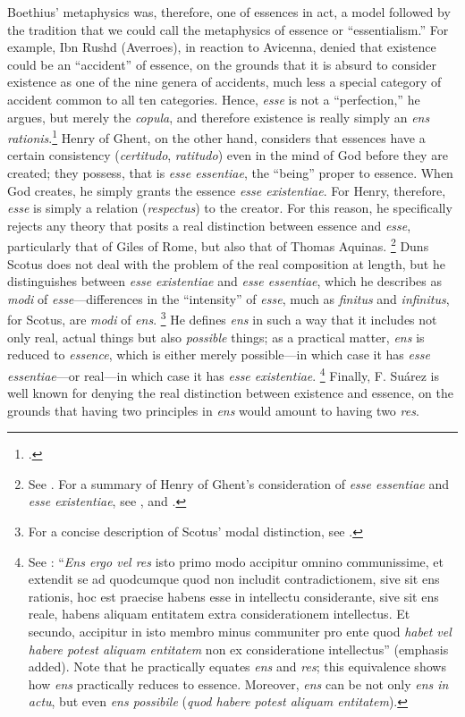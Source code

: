 Boethius’ metaphysics was, therefore, one of essences in act, a model followed by the tradition that we could call the metaphysics of essence or “essentialism.” For example, Ibn Rushd (Averroes), in reaction to Avicenna, denied that existence could be an “accident” of essence, on the grounds that it is absurd to consider existence as one of the nine genera of accidents, much less a special category of accident common to all ten categories. Hence, \emph{esse} is not a “perfection,” he argues, but merely the \emph{copula}, and therefore existence is really simply an \emph{ens rationis}.\footcite[See][68–69]{gilson:letre} Henry of Ghent, on the other hand, considers that essences have a certain consistency (\emph{certitudo}, \emph{ratitudo}) even in the mind of God before they are created; they possess, that is \emph{esse essentiae}, the “being” proper to essence. When God creates, he simply grants the essence \emph{esse existentiae}. For Henry, therefore, \emph{esse} is simply a relation (\emph{respectus}) to the creator. For this reason, he specifically rejects any theory that posits a real distinction between essence and \emph{esse}, particularly that of Giles of Rome, but also that of Thomas Aquinas.%
%
\footnote{See \cite[474–475]{copleston:history:02}. For a summary of Henry of Ghent’s consideration of \emph{esse essentiae} and \emph{esse existentiae}, see \cite[450–451]{gilson:history}, and \cite[6–7]{stanford:henry-of-ghent}.} Duns Scotus does not deal with the problem of the real composition at length, but he distinguishes between \emph{esse existentiae} and \emph{esse essentiae}, which he describes as \emph{modi} of \emph{esse}—differences in the “intensity” of \emph{esse}, much as \emph{finitus} and \emph{infinitus}, for Scotus, are \emph{modi} of \emph{ens}.%
%
\footnote{For a concise description of Scotus’ modal distinction, see \cite[25–26]{companion:scotus}.} He defines \emph{ens} in such a way that it includes not only real, actual things but also \emph{possible} things; as a practical matter, \emph{ens} is reduced to \emph{essence}, which is either merely possible—in which case it has \emph{esse essentiae}—or real—in which case it has  \emph{esse existentiae}.%
%
\footnote{See \cite[q.~3, {[2]}, n.~1]{scotus:quodlibet}: “\emph{Ens ergo vel res} isto primo modo accipitur omnino communissime, et extendit se ad quodcumque quod non includit contradictionem, sive sit ens rationis, hoc est praecise habens esse in intellectu considerante, sive sit ens reale, habens aliquam entitatem extra considerationem intellectus. Et secundo, accipitur in isto membro minus communiter pro ente quod \emph{habet vel habere potest aliquam entitatem} non ex consideratione intellectus” (emphasis added). Note that he practically equates \emph{ens} and \emph{res}; this equivalence shows how \emph{ens} practically reduces to essence. Moreover, \emph{ens} can be not only \emph{ens in actu}, but even \emph{ens possibile} (\emph{quod habere potest aliquam entitatem}).}  Finally, F. Suárez is well known for denying the real distinction between existence and essence, on the grounds that having two principles in \emph{ens} would amount to having two \emph{res}.%

